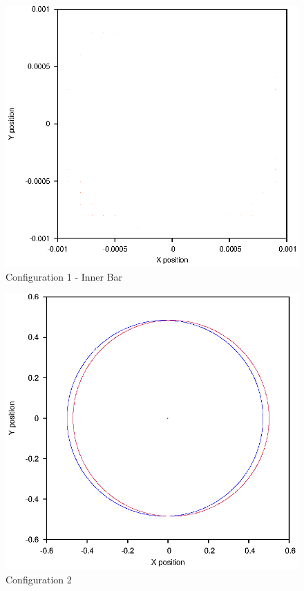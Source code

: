 \documentclass[a4paper,12pt]{article}
\begin{document}
\begin{figure}[H]
\centering
\includegraphics[width=.9\textwidth]{./2016results/stablebase/Inner.eps}
\caption{Configuration 1 - Inner Bar}
\label{fig:config1i}
\end{figure}

\begin{figure}[H]
\centering
\includegraphics[width=.9\textwidth]{./2016results/002-5-001/Orbit.eps}
\caption{Configuration 2}
\label{fig:config2}
\end{figure}
\end{document}
